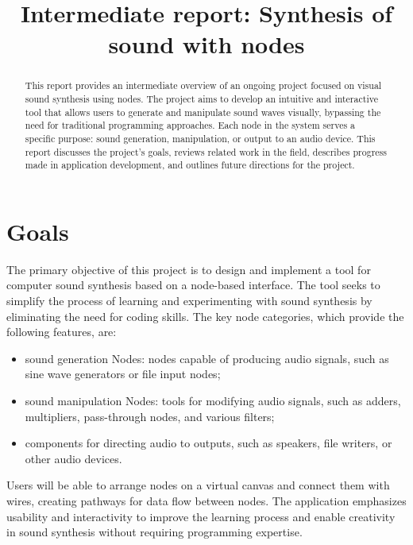 \documentclass[conference]{IEEEtran}
\begin{document}
\title{Intermediate report: Synthesis of sound with nodes}

\maketitle

\begin{abstract}
This report provides an intermediate overview of an ongoing project focused on visual sound synthesis using nodes. The project aims to develop an intuitive and interactive tool that allows users to generate and manipulate sound waves visually, bypassing the need for traditional programming approaches. Each node in the system serves a specific purpose: sound generation, manipulation, or output to an audio device. This report discusses the project’s goals, reviews related work in the field, describes progress made in application development, and outlines future directions for the project.
\end{abstract}

\IEEEpeerreviewmaketitle

\section{Goals}
The primary objective of this project is to design and implement a tool for computer sound synthesis based on a node-based interface. The tool seeks to simplify the process of learning and experimenting with sound synthesis by eliminating the need for coding skills. 
The key node categories, which provide the following features, are:\label{basicsaudionodes}
\begin{itemize}
    \item sound generation Nodes: nodes capable of producing audio signals, such as sine wave generators or file input nodes;
    \item sound manipulation Nodes: tools for modifying audio signals, such as adders, multipliers, pass-through nodes, and various filters;
    \item components for directing audio to outputs, such as speakers, file writers, or other audio devices.
\end{itemize}
Users will be able to arrange nodes on a virtual canvas and connect them with wires, creating pathways for data flow between nodes.  The application emphasizes usability and interactivity to improve the learning process and enable creativity in sound synthesis without requiring programming expertise.
\end{document}
